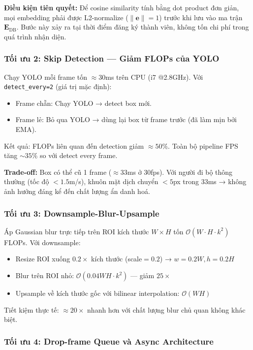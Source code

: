 \textbf{Điều kiện tiên quyết:} Để cosine similarity tính bằng dot product đơn giản, mọi embedding phải được L2-normalize ($\|\mathbf{e}\| = 1$) trước khi lưu vào ma trận $\mathbf{E}_\text{DB}$. Bước này xảy ra tại thời điểm đăng ký thành viên, không tốn chi phí trong quá trình nhận diện.

\subsubsection{Tối ưu 2: Skip Detection --- Giảm FLOPs của YOLO}
\label{subsubsec:opt_skipdetect}

Chạy YOLO mỗi frame tốn $\approx$30ms trên CPU (i7 @2.8GHz). Với \texttt{detect\_every=2} (giá trị mặc định):
\begin{itemize}
    \item Frame chẵn: Chạy YOLO → detect box mới.
    \item Frame lẻ: Bỏ qua YOLO → dùng lại box từ frame trước (đã làm mịn bởi EMA).
\end{itemize}
Kết quả: FLOPs liên quan đến detection giảm $\approx 50\%$. Toàn bộ pipeline FPS tăng $\sim 35\%$ so với detect every frame.

\textbf{Trade-off:} Box có thể cũ 1 frame ($\approx$33ms ở 30fps). Với người đi bộ thông thường (tốc độ $< 1.5$m/s), khuôn mặt dịch chuyển $< 5$px trong 33ms → không ảnh hưởng đáng kể đến chất lượng ẩn danh hoá.

\subsubsection{Tối ưu 3: Downsample-Blur-Upsample}
\label{subsubsec:opt_blur}

Áp Gaussian blur trực tiếp trên ROI kích thước $W \times H$ tốn $\mathcal{O}(W \cdot H \cdot k^2)$ FLOPs. Với downsample:
\begin{itemize}
    \item Resize ROI xuống $0.2 \times$ kích thước (scale$=0.2$) → $w = 0.2W, h = 0.2H$
    \item Blur trên ROI nhỏ: $\mathcal{O}(0.04WH \cdot k^2)$ --- giảm $25\times$
    \item Upsample về kích thước gốc với bilinear interpolation: $\mathcal{O}(WH)$
\end{itemize}
Tiết kiệm thực tế: $\approx 20\times$ nhanh hơn với chất lượng blur chủ quan không khác biệt.

\subsubsection{Tối ưu 4: Drop-frame Queue và Async Architecture}
\label{subsubsec:opt_queue}

